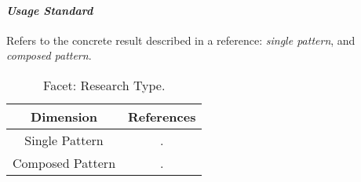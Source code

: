 \paragraph{\bf\em Usage Standard}  
Refers to the concrete result described in a reference: {\em single pattern},
and {\em composed pattern}.
\begin{table}\centering
\footnotesize
\begin{tabular}{|c|c|}\hline
\textbf{Dimension} & \textbf{References} \\ \hline
Single Pattern	& 
\parbox{0.6\textwidth}{\cite{}.}
\\ \hline
Composed Pattern	& 
\parbox{0.6\textwidth}{\cite{}.}
\\ \hline
\end{tabular}
\caption{\label{table:biblioResearch} Facet: Research Type.}
\end{table}
